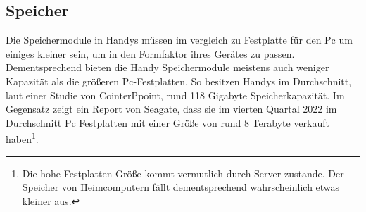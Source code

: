 \subsection{Speicher}\myCheckmark
Die Speichermodule in Handys müssen im vergleich zu Festplatte für den Pc um einiges kleiner sein, um in den Formfaktor ihres Gerätes zu passen. Dementsprechend bieten die Handy Speichermodule meistens auch weniger Kapazität als die größeren Pc-Festplatten. %
	So besitzen Handys im Durchschnitt, laut einer Studie von CointerPpoint, rund 118 Gigabyte Speicherkapazität\cite{pcVsphone_storageSmartphone}. Im Gegensatz zeigt ein Report von Seagate, dass sie im vierten Quartal 2022 im Durchschnitt Pc Festplatten mit einer Größe von rund 8 Terabyte verkauft haben\cite{pcVsphone_storageSeagate}\footnote{Die hohe Festplatten Größe kommt vermutlich durch Server zustande. Der Speicher von Heimcomputern fällt dementsprechend wahrscheinlich etwas kleiner aus.}. 

